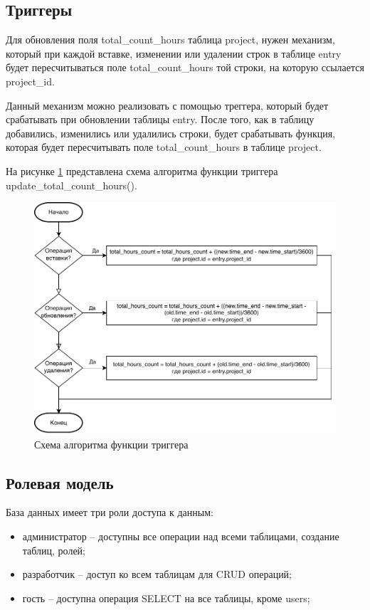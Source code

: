 \subsection{Триггеры}
Для обновления поля total\_count\_hours таблица project, нужен механизм, который при каждой вставке, изменении или удалении строк в таблице entry будет пересчитываться поле total\_count\_hours той строки, на которую ссылается project\_id.

Данный механизм можно реализовать с помощью треггера, который будет срабатывать при обновлении таблицы entry. После того, как в таблицу добавились, изменились или удалились строки, будет срабатывать функция, которая будет пересчитывать поле total\_count\_hours в таблице project.

\newpage
На рисунке \ref{fig:trigger} представлена схема алгоритма функции триггера \\update\_total\_count\_hours().

\begin{figure}[hbtp]
	\centering
	\includegraphics[width=\textwidth]{img/trigger.drawio.pdf}
	\caption{Схема алгоритма функции триггера}
	\label{fig:trigger}
\end{figure}

\subsection{Ролевая модель}

База данных имеет три роли доступа к данным:
\begin{itemize}[leftmargin=1.6\parindent]
	\item администратор --  доступны все операции над всеми таблицами, создание таблиц, ролей;
	\item разработчик -- доступ ко всем таблицам для CRUD операций;
	\item гость -- доступна операция SELECT на все таблицы, кроме users;
\end{itemize}


